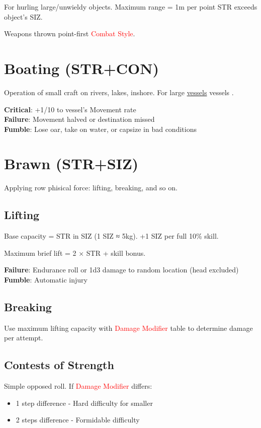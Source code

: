 \documentclass[10pt]{article}
\begin{document}
For hurling large/unwieldy objects. Maximum range = 1m per point STR exceeds object's SIZ.

Weapons thrown point-first \textcolor{red}{Combat Style}.

\section{Boating (STR+CON)}
\label{skill:boating}

Operation of small craft on rivers, lakes, inshore. For large \hyperref[sec:vehicles]{vessels} vessels .

\textbf{Critical}: +1/10 to vessel's Movement rate\\
\textbf{Failure}: Movement halved or destination missed\\
\textbf{Fumble}: Lose oar, take on water, or capsize in bad conditions

\section{Brawn (STR+SIZ)}
\label{skill:brawn}

Applying row phisical force: lifting, breaking, and so on.

\subsection{Lifting}
\label{skill:lifting}

Base capacity = STR in SIZ (1 SIZ ≈ 5kg). +1 SIZ per full 10\% skill.

Maximum brief lift = 2 × STR + skill bonus.

\textbf{Failure}: Endurance roll or 1d3 damage to random location (head excluded)\\
\textbf{Fumble}: Automatic injury

\subsection{Breaking}
\label{skill:breaking}

Use maximum lifting capacity with \textcolor{red}{Damage Modifier} table to determine damage per attempt.

\subsection{Contests of Strength}
\label{skill:strength-contest}

Simple opposed roll. If \textcolor{red}{Damage Modifier} differs:
\begin{itemize}
    \item 1 step difference - Hard difficulty for smaller
    \item 2 steps difference - Formidable difficulty
\end{itemize}
\end{document}
